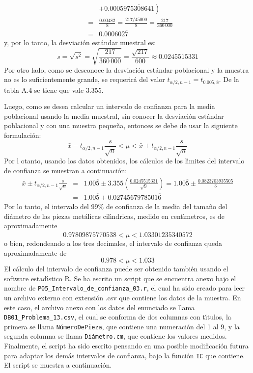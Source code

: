 \begin{solucion}
\begin{eqnarray*}
  & & \left. + 0.0005\overline{975308641} \right) \\
  & = & \frac{0.0048\overline{2}}{8} = \frac{217/45000}{8} = \frac{217}{360\,000} \\
  & = & 0.000602\overline{7}
 \end{eqnarray*}
 y, por lo tanto, la desviaci\'on est\'andar muestral es:
 \begin{equation*}
  s = \sqrt{s^2} = \sqrt{\frac{217}{360\,000}} = \frac{\sqrt{217}}{600} \approx 0.0245515331
 \end{equation*}
 Por otro lado, como se desconoce la desviaci\'on est\'andar poblacional y la muestra no es lo suficientemente grande, se requerir\'a del valor $t_{\alpha/2,n-1} = t_{0.005,8}$. De la tabla A.4 se tiene que vale $3.355$.
 \par 
 Luego, como se desea calcular un intervalo de confianza para la media poblacional usando la media muestral, sin conocer la desviaci\'on est\'andar poblacional y con una muestra peque\~na, entonces se debe de usar la siguiente formulaci\'on:
 \begin{equation*}
  \bar{x} - t_{\alpha/2,n-1} \frac{s}{\sqrt{n}} < \mu < \bar{x} + t_{\alpha/2,n-1} \frac{s}{\sqrt{n}}
 \end{equation*}
 Por l otanto, usando los datos obtenidos, los c\'alculos de los l\'{\i}mites del intervalo de confianza se muestran a continuaci\'on:
 \begin{eqnarray*}
  \bar{x} \pm t_{\alpha/2,n-1} \frac{s}{\sqrt{n}} & = & 1.00\overline{5} \pm  3.355\left( \frac{0.0245515331}{\sqrt{9}} \right) = 1.00\overline{5} \pm \frac{0.0823703935505}{3} \\
  & = & 1.00\overline{5} \pm 0.0274567978501\overline{6}
 \end{eqnarray*}
 Por lo tanto, el intervalo del $99\%$ de confianza de la media del tama\~no del di\'ametro de las piezas met\'alicas cil\'{\i}ndricas, medido en cent\'{\i}metros, es de aproximadamente
 \begin{equation*}
  0.9780987577053\overline{8} < \mu < 1.0330123534057\overline{2}
 \end{equation*}
 o bien, redondeando a los tres decimales, el intervalo de confianza queda aproximadamente de
 \begin{equation*}
  0.978 < \mu < 1.033
 \end{equation*}
 El c\'alculo del intervalo de confianza puede ser obtenido tambi\'en usando el software estad\'{\i}stico R. Se ha escrito un script que se encuentra anexo bajo el nombre de \texttt{P05\_Intervalo\_de\_confianza\_03.r}, el cual ha sido creado para leer un archivo externo con extensi\'on .csv que contiene los datos de la muestra. En este caso, el archivo anexo con los datos del enunciado se llama \texttt{DB01\_Problema\_13.csv}, el cual se conforma de dos columnas con t\'{\i}tulos, la primera se llama \texttt{N\'umeroDePieza}, que contiene una numeraci\'on del 1 al 9, y la segunda columna se llama \texttt{Di\'ametro.cm}, que contiene los valores medidos. Finalmente, el script ha sido escrito pensando en una posible modificaci\'on futura para adaptar los dem\'as intervalos de confianza, bajo la funci\'on \texttt{IC} que contiene. El script se muestra a continuaci\'on.

\end{solucion}
